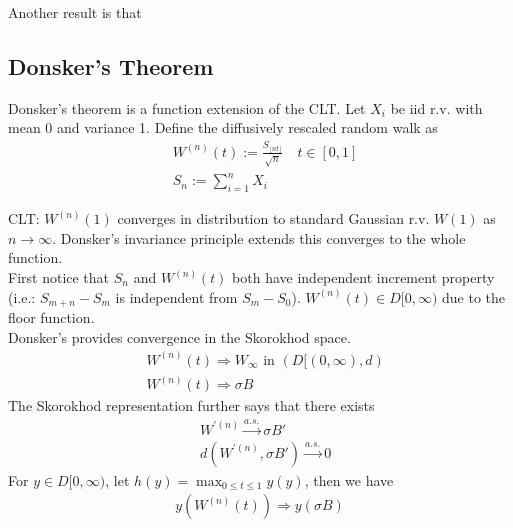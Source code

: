 Another result is that 



\subsection{Donsker's Theorem} 
Donsker's theorem is a function extension of the CLT. Let $X_i$ be iid r.v. with mean 0 and variance 1. Define the diffusively rescaled random walk as 
    \begin{align*}
        & W^{(n)}(t) := \frac{S_{\lfloor nt \rfloor}}{\sqrt{n}} \quad t\in[0,1] \\
        & S_n := \sum_{i=1}^n X_i 
    \end{align*}
    
CLT: $W^{(n)}(1)$ converges in distribution to standard Gaussian r.v. $W(1)$ as $n\to\infty$. Donsker's invariance principle extends this converges to the whole function.  \\

First notice that $S_n$ and $W^{(n)}(t)$ both have independent increment property (i.e.: $S_{m+n} - S_m $ is independent from $S_m - S_0$).  $W^{(n)}(t) \in D[0, \infty)$ due to the floor function. \\

Donsker's provides convergence in the Skorokhod space. 
    \begin{align*}
        & W^{(n)}(t) \Rightarrow W_\infty \text{ in } (D[(0, \infty), d) \\
        & W^{(n)}(t) \Rightarrow \sigma B \tag{Standard Brownian Motion}
    \end{align*}
The Skorokhod representation further says that there exists 
    \begin{align*}
        & W^{'(n)} \overset{a.s.}{\to} \sigma B'\\
        & d(W^{'(n)}, \sigma B') \overset{a.s.}{\to} 0
    \end{align*}
For $y\in D[0, \infty)$, let $h(y) = \max_{0 \leq t \leq 1}y(y)$, then we have 
    \begin{align*}
        y(W^{(n)}(t)) \Rightarrow y(\sigma B)
    \end{align*}

